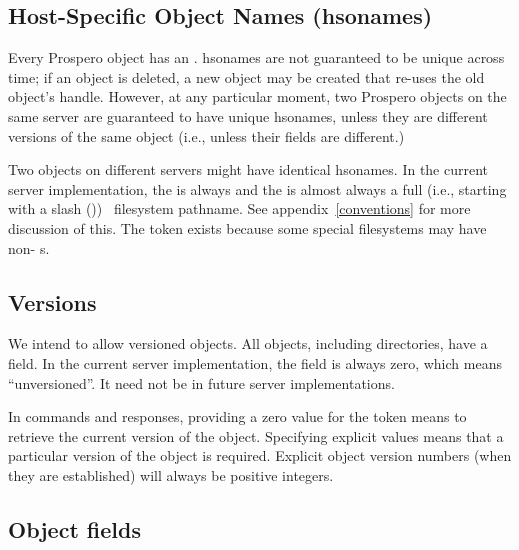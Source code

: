 \subsection{Host-Specific Object Names ({\sc hsoname}s)}

Every Prospero object has an
.  {\sc hsoname}s are not guaranteed to be unique across time; if
an object is deleted, 
a new
object may be created that re-uses the old object's handle.  However,
at any particular moment, two Prospero objects on the same server are
guaranteed to have unique hsonames, unless they are different versions
of the same object (i.e., unless their  fields are
different.)

Two objects on different servers might have identical
hsonames.  
In the current server implementation, the  is always 
 and the  is almost always a full
(i.e., starting with a slash (\lit{/})) \unix\ 
filesystem pathname.  See appendix~\ref{conventions} for more
discussion of this.
The  token exists because some special
filesystems may have non- s.

\subsection{Versions\label{object version numbers}}

We intend to allow versioned objects.  All objects, including
directories,  have a
 field.  In the current server
implementation, the \atr{version-number} field is always zero, which means
``unversioned''.  It need not be in future server implementations.  

In commands and responses, providing a zero value for the
 token means to retrieve the current version of
the object.  Specifying explicit values means that a particular
version of the object is required.  Explicit object version numbers
(when they are established) will always be positive integers.

\subsection{Object  fields}

